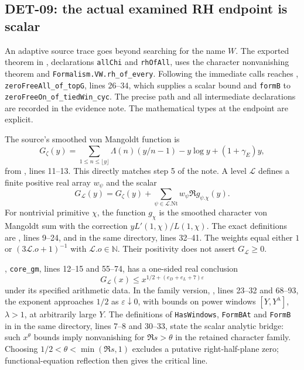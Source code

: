\documentclass[11pt,a4paper]{article}
\begin{document}
\subsection{DET-09: the actual examined RH endpoint is scalar}
An adaptive source trace goes beyond searching for the name $W$. The exported theorem in , declarations \texttt{allChi} and \texttt{rhOfAll}, uses the character nonvanishing theorem and \texttt{Formalism.VW.rh\_of\_every}. Following the immediate calls reaches , \texttt{zeroFreeAll\_of\_topG}, lines 26--34, which supplies a scalar bound and \texttt{formB} to \texttt{zeroFreeOn\_of\_tiedWin\_cyc}. The precise path and all intermediate declarations are recorded in the evidence note. The mathematical types at the endpoint are explicit.

The source's smoothed von Mangoldt function is
\[
 G_\zeta(y)=\sum_{1\le n\le\lfloor y\rfloor}\Lambda(n)(y/n-1)
 -y\log y+(1+\gamma_E)y,
\]
from , lines 11--13. This directly matches step 5 of the note. A level $\mathcal L$ defines a finite positive real array $w_\psi$ and the scalar
\[
 G_{\mathcal L}(y)=G_\zeta(y)+\sum_{\psi\in\mathcal L.\mathrm{Nt}}w_\psi\Re g_{\psi.\chi}(y).
\]
For nontrivial primitive $\chi$, the function $g_\chi$ is the smoothed character von Mangoldt sum with the correction $yL'(1,\chi)/L(1,\chi)$. The exact definitions are , lines 9--24, and  in the same directory, lines 32--41. The weights equal either $1$ or $(3\mathcal L.o+1)^{-1}$ with $\mathcal L.o\in\mathbb N$. Their positivity does not assert $G_{\mathcal L}\ge0$.

, \texttt{core\_gm}, lines 12--15 and 55--74, has a one-sided real conclusion
\[
 G_{\mathcal L}(x)\le x^{1/2+(e_D+e_L+7)\varepsilon}
\]
under its specified arithmetic data. In the family version, , lines 23--32 and 68--93, the exponent approaches $1/2$ as $\varepsilon\downarrow0$, with bounds on power windows $[Y,Y^\lambda]$, $\lambda>1$, at arbitrarily large $Y$. The definitions of \texttt{HasWindows}, \texttt{FormBAt} and \texttt{FormB} in  in the same directory, lines 7--8 and 30--33, state the scalar analytic bridge: such $x^\theta$ bounds imply nonvanishing for $\Re s>\theta$ in the retained character family. Choosing $1/2<\theta<\min(\Re s,1)$ excludes a putative right-half-plane zero; functional-equation reflection then gives the critical line.
\end{document}
